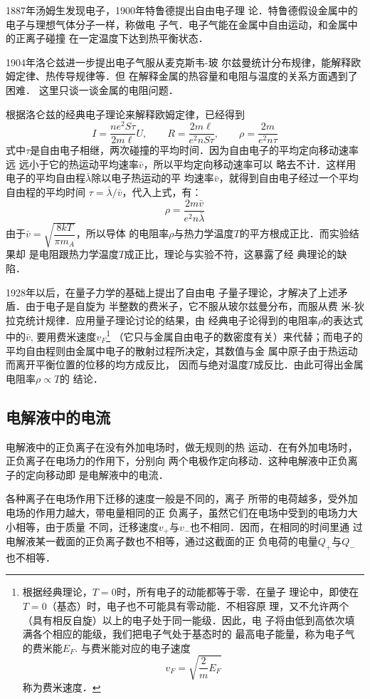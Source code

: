 1887年汤姆生发现电子，1900年特鲁德提出自由电子理
论．特鲁德假设金属中的电子与理想气体分子一样，称做电
子气．电子气能在金属中自由运动，和金属中的正离子碰撞
在一定温度下达到热平衡状态．

1904年洛仑兹进一步提出电子气服从麦克斯韦-玻
尔兹曼统计分布规律，能解释欧姆定律、热传导规律等．但
在解释金属的热容量和电阻与温度的关系方面遇到了困难．
这里只谈一谈金属的电阻问题．

根据洛仑兹的经典电子理论来解释欧姆定律，已经得到
\[I=\frac{n e^{2} S \tau}{2 m \ell} U , \qquad R=\frac{2 m \ell}{e^{2} n S \tau} ,\qquad \rho=\frac{2 m}{e^{2} n \tau}\]
式中$\tau$是自由电子相继，两次碰撞的平均时间．因为自由电子的平均定向移动速率远
远小于它的热运动平均速率$\bar v$，所以平均定向移动速率可以
略去不计．这样用电子的平均自由程$\bar\lambda$除以电子热运动的平
均速率$\bar v$，就得到自由电子经过一个平均自由程的平均时间
$\tau=\bar\lambda/\bar v$，代入上式，有：
\[\rho=\frac{2m\bar v}{e^2n\bar\lambda}\]
由于$\bar v=\sqrt{\dfrac{8kT}{\pi m_A}}$，所以导体
的电阻率$\rho$与热力学温度$T$的平方根成正比．而实验结果却
是电阻跟热力学温度$T$成正比，理论与实验不符，这暴露了经
典理论的缺陷．

1928年以后，在量子力学的基础上提出了自由电
子量子理论，才解决了上述矛盾．由于电子是自旋为
半整数的费米子，它不服从玻尔兹曼分布，而服从费
米-狄拉克统计规律．应用量子理论讨论的结果，由
经典电子论得到的电阻率$\rho$的表达式中的$\bar v$, 要用费米速度$v_F$\footnote{根据经典理论，$T=0$时，所有电子的动能都等于零．在量子
理论中，即使在$T=0$（基态）时，电子也不可能具有零动能．不相容原
理，又不允许两个（具有相反自旋）以上的电子处于同一能级．因此，电
子将由低到高依次填满各个相应的能级，我们把电子气处于基态时的
最高电子能量，称为电子气的费米能$E_F$. 与费米能对应的电子速度
\[v_F=\sqrt{\frac{2}{m}E_F}\]
称为费米速度． }
（它只与金属自由电子的数密度有关）来代替；而电子的
平均自由程则由金属中电子的散射过程所决定，其数值与金
属中原子由于热运动而离开平衡位置的位移的均方成反比，
因而与绝对温度$T$成反比．由此可得出金属电阻率$\rho\propto T$的
结论．

\subsection{电解液中的电流}
电解液中的正负离子在没有外加电场时，做无规则的热
运动．在有外加电场时，正负离子在电场力的作用下，分别向
两个电极作定向移动．这种电解液中正负离子的定向移动即
是电解液中的电流．

各种离子在电场作用下迁移的速度一般是不同的，离子
所带的电荷越多，受外加电场的作用力越大，带电量相同的正
负离子，虽然它们在电场中受到的电场力大小相等，由于质量
不同，迁移速度$v_+$与$v_{-}$也不相同．因而，在相同的时间里通
过电解液某一截面的正负离子数也不相等，通过这截面的正
负电荷的电量$Q_+$与$Q_-$也不相等．


